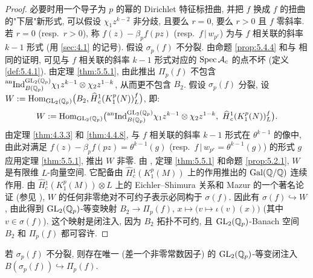 \begin{proof}
必要时用一个导子为 $p$ 的幂的 Dirichlet 特征标扭曲, 并把 $f$ 换成 $f$ 的扭曲的"下层"新形式, 可以假设 $\chi_1z^{k-2}$ 非分歧, 且要么 $r = 0$, 要么 $r > 0$ 且 $f$ 零斜率.
若 $r = 0$ (resp.\ $r > 0$), 称 $f(z) - \beta_p f(pz)$ (resp.\ $f\,|\,w_{p^{r}}$) 为与 $f$ 相关联的斜率 $k-1$ 形式 (用 \ref{sec:4.1} 的记号).
假设 $\sigma_p(f)$ 不分裂.
由命题 \ref{prop:5.4.4} 和与 \cite[Prop.~11]{ref:30} 相同的证明, 可见与 $f$ 相关联的斜率 $k-1$ 形式对应的 $\operatorname{Spec} \mathcal{A}_c$ 的点不坏 (定义 \ref{def:5.4.1}).
由定理 \ref{thm:5.5.1}, 由此推出 $\Pi_p(f)$ 不包含 $\prescript{\mathrm{an}}{}{\mathrm{Ind}}_{B(\mathbb{Q}_p)}^{\mathrm{GL}_2(\mathbb{Q}_p)} \chi_1z^{k-1} \otimes \chi_2z^{1-k}$, 从而更不包含 $B_2$.
假设 $\sigma_p(f)$ 分裂, 设 $W := \operatorname{Hom}_{\mathrm{GL}_2(\mathbb{Q}_p)}\bigl(B_2,\widehat{H}{}_{c}^{1}(K_1^{p}(N))_{L}^{f}\bigr)$, 即:
\[
W := \Hom_{\GL_2(\Qp)}\bigl(\anind_{B(\Qp)}^{\GL_2(\Qp)} \chi_1z^{k-1} \otimes \chi_2z^{1-k},\ \widehat{H}{}_{c}^{1}(K_1^{p}(N))_{L}^{f}\bigr).
\]
由定理 \ref{thm:4.3.3} 和 \ref{thm:4.4.8}, 与 $f$ 相关联的斜率 $k-1$ 形式在 $\theta^{k-1}$ 的像中, 由此对满足 $f(z) - \beta_p f(pz) = \theta^{k-1}(g)$ (resp.\ $f\,|\,w_{p^{r}} = \theta^{k-1}(g)$) 的形式 $g$ 应用定理 \ref{thm:5.5.1}, 推出 $W$ 非零.
由 \cite[\S4]{ref:24}, 定理 \ref{thm:5.5.1} 和命题 \ref{prop:5.2.1}, $W$ 是有限维 $L$-向量空间.
它配备由 $\widehat{H}{}_{c}^{1}(K_1^{p}(M))$ 上的作用推出的 $\operatorname{Gal}(\mathbb{Q}/\mathbb{Q})$ 连续作用.
由 $\widehat{H}{}_{c}^{1}(K_1^{p}(M)) \otimes L$ 上的 Eichler--Shimura 关系和 Mazur 的一个著名论证 (参见 \cite[p.~115]{ref:38}), $W$ 的任何非零绝对不可约子表示必同构于 $\sigma(f)$.
因此有 $\sigma(f) \hookrightarrow W$, 由此得到 $\mathrm{GL}_2(\mathbb{Q}_p)$-等变映射 $B_2 \to \Pi_p(f)$, $x \mapsto \bigl(v \mapsto \iota(v)(x)\bigr)$ (其中 $v \in \sigma(f)$).
这个映射是闭注入, 因为 $B_2$ 拓扑不可约, 且 $\mathrm{GL}_2(\mathbb{Q}_p)$-Banach 空间 $B_2$ 和 $\Pi_p(f)$ 都可容许.
\end{proof}

\begin{theorem}\label{thm:5.7.3}
若 $\sigma_p(f)$ 不分裂, 则存在唯一 (差一个非零常数因子) 的 $\mathrm{GL}_2(\mathbb{Q}_p)$-等变闭注入 $B(\sigma_p(f)) \hookrightarrow \Pi_p(f)$.
\end{theorem}

